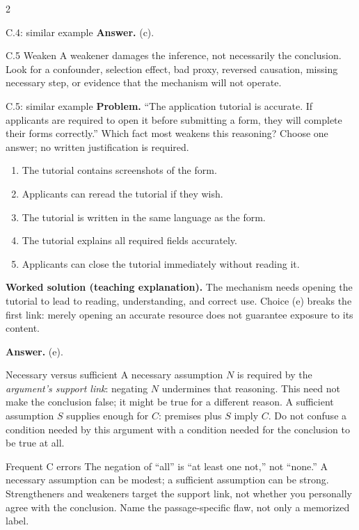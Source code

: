 \documentclass[10pt]{extarticle}
\begin{document}
\begin{multicols}{2}
\begin{workedbox}{C.4: similar example}
\textbf{Answer.} (c).
\end{workedbox}

\begin{methodbox}{C.5 Weaken}
A weakener damages the inference, not necessarily the conclusion. Look for a
confounder, selection effect, bad proxy, reversed causation, missing necessary
step, or evidence that the mechanism will not operate.
\end{methodbox}

\begin{workedbox}{C.5: similar example}
\textbf{Problem.} ``The application tutorial is accurate. If applicants are required to open it before submitting a form, they will complete their forms correctly.'' Which fact most weakens this reasoning? Choose one answer; no written justification is required.

\begin{enumerate}[label=(\alph*)]
\item The tutorial contains screenshots of the form.
\item Applicants can reread the tutorial if they wish.
\item The tutorial is written in the same language as the form.
\item The tutorial explains all required fields accurately.
\item Applicants can close the tutorial immediately without reading it.
\end{enumerate}
\textbf{Worked solution (teaching explanation).} The mechanism needs opening the tutorial to lead to reading, understanding, and correct use. Choice (e) breaks the first link: merely opening an accurate resource does not guarantee exposure to its content.

\textbf{Answer.} (e).
\end{workedbox}

\begin{definitionbox}{Necessary versus sufficient}
A necessary assumption $N$ is required by the \emph{argument's support link}:
negating $N$ undermines that reasoning. This need not make the conclusion false;
it might be true for a different reason. A sufficient assumption $S$ supplies
enough for $C$: premises plus $S$ imply $C$. Do not confuse a condition needed
by this argument with a condition needed for the conclusion to be true at all.
\end{definitionbox}

\begin{warningbox}{Frequent C errors}
The negation of ``all'' is ``at least one not,'' not ``none.'' A necessary
assumption can be modest; a sufficient assumption can be strong. Strengtheners
and weakeners target the support link, not whether you personally agree with the
conclusion. Name the passage-specific flaw, not only a memorized label.
\end{warningbox}


\end{multicols}
\end{document}
